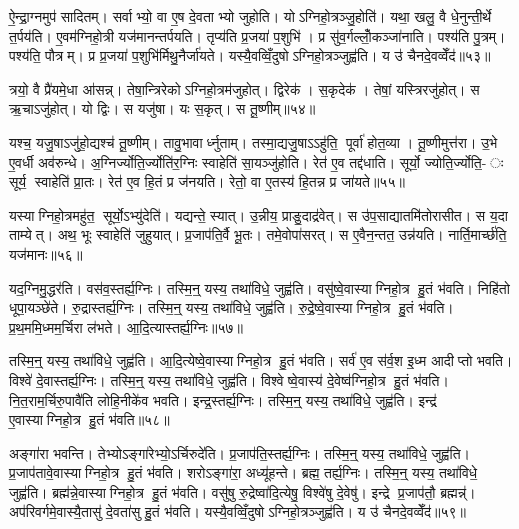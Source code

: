 ऐ॒न्द्रा॒ग्नमुप॑ सादितम्। सर्वाभ्यो॒ वा ए॒ष दे॒वताभ्यो जुहोति। योऽग्निहो॒त्रञ्जु॒होति॑। यथा॒ खलु॒ वै धे॒नुन्ती॒र्थे त॒र्पय॑ति। ए॒वम॑ग्निहो॒त्री यज॑मानन्तर्पयति। तृप्य॑ति प्र॒जया॑ प॒शुभि॑। प्र सु॑व॒र्गल्लोँ॒कञ्जा॑नाति। पश्य॑ति पु॒त्रम्। पश्य॑ति॒ पौत्रम्। प्र प्र॒जया॑ प॒शुभि॑र्मिथु॒नैर्जा॑यते। यस्यै॒वव्विँ॒दुषोऽग्निहो॒त्रञ्जुह्व॑ति। य उ॑ चैनदे॒वव्वेँद॑॥५३॥\anuvakamend[बुभू॑षेद्ध्रि॒यमा॑णञ्जायते॒ द्वे च॑]

त्रयो॒ वै प्रै॑यमे॒धा आ॑सन्न्। तेषा॒न्त्रिरेकोऽग्निहो॒त्रम॑जुहोत्। द्विरेक॑। स॒कृदेक॑। तेषां॒ यस्त्रिरजु॑होत्। स ऋ॒चाऽजु॑होत्। यो द्विः। स यजु॑षा। यः स॒कृत्। स तू॒ष्णीम्॥५४॥

यश्च॒ यजु॒षाऽजु॑हो॒द्यश्च॑ तू॒ष्णीम्। तावु॒भावार्ध्नुताम्। तस्मा॒द्यजु॒षाऽऽहु॑ति॒ पूर्वा॑ होत॒व्या। तू॒ष्णीमुत्त॑रा। उ॒भे ए॒वर्धी अव॑रुन्धे। अ॒ग्निर्ज्योति॒र्ज्योति॑र॒ग्निः स्वाहेति॑ सा॒यञ्जु॑होति। रेत॑ ए॒व तद्द॑धाति। सूर्यो॒ ज्योति॒र्ज्योति॒- ः सूर्य॒ स्वाहेति॑ प्रा॒तः। रेत॑ ए॒व हि॒तं प्र ज॑नयति। रेतो॒ वा ए॒तस्य॑ हि॒तन्न प्र जा॑यते॥५५॥

यस्याग्निहो॒त्रमहु॑त॒ सूर्यो॒ऽभ्यु॑देति॑। यद्यन्ते॒ स्यात्। उ॒न्नीय॒ प्राङु॒दाद्र॑वेत्। स उ॑प॒साद्यातमि॑तोरासीत। स य॒दा ताम्येत्। अथ॒ भूः स्वाहेति॑ जुहुयात्। प्र॒जाप॑ति॒र्वै भू॒तः। तमे॒वोपा॑सरत्। स ए॒वैन॒न्तत॒ उन्न॑यति। नार्ति॒मार्च्छ॑ति॒ यज॑मानः॥५६॥\anuvakamend[तू॒ष्णीञ्जा॑यते॒ यज॑मानः]

यद॒ग्निमु॒द्धर॑ति। वस॑व॒स्तर्ह्य॒ग्निः। तस्मि॒न्॒ यस्य॒ तथा॑विधे॒ जुह्व॑ति। वसु॑ष्वे॒वास्याग्निहो॒त्र हु॒तं भ॑वति। निहि॑तो धूपा॒यञ्छे॑ते। रु॒द्रास्तर्ह्य॒ग्निः। तस्मि॒न्॒ यस्य॒ तथा॑विधे॒ जुह्व॑ति। रु॒द्रे॒ष्वे॒वास्याग्निहो॒त्र हु॒तं भ॑वति। प्र॒थ॒ममि॒ध्मम॒र्चिरा ल॑भते। आ॒दि॒त्यास्तर्ह्य॒ग्निः॥५७॥

तस्मि॒न्॒ यस्य॒ तथा॑विधे॒ जुह्व॑ति। आ॒दि॒त्येष्वे॒वास्याग्निहो॒त्र हु॒तं भ॑वति। सर्व॑ ए॒व स॑र्व॒श इ॒ध्म आदीप्तो भवति। विश्वे॑ दे॒वास्तर्ह्य॒ग्निः। तस्मि॒न्॒ यस्य॒ तथा॑विधे॒ जुह्व॑ति। विश्वेष्वे॒वास्य॑ दे॒वेष्व॑ग्निहो॒त्र हु॒तं भ॑वति। नि॒त॒राम॒र्चिरु॒पावै॑ति लोहि॒नीके॑व भवति। इन्द्र॒स्तर्ह्य॒ग्निः। तस्मि॒न्॒ यस्य॒ तथा॑विधे॒ जुह्व॑ति। इन्द्र॑ ए॒वास्याग्निहो॒त्र हु॒तं भ॑वति॥५८॥

अङ्गा॑रा भवन्ति। तेभ्योऽङ्गा॑रेभ्यो॒ऽर्चिरुदे॑ति। प्र॒जाप॑ति॒स्तर्ह्य॒ग्निः। तस्मि॒न्॒ यस्य॒ तथा॑विधे॒ जुह्व॑ति। प्र॒जाप॑तावे॒वास्याग्निहो॒त्र हु॒तं भ॑वति। शरोऽङ्गा॑रा॒ अध्यू॑हन्ते। ब्रह्म॒ तर्ह्य॒ग्निः। तस्मि॒न्॒ यस्य॒ तथा॑विधे॒ जुह्व॑ति। ब्रह्म॑न्ने॒वास्याग्निहो॒त्र हु॒तं भ॑वति। वसु॑षु रु॒द्रेष्वा॑दि॒त्येषु॒ विश्वे॑षु दे॒वेषु॑। इन्द्रे प्र॒जाप॑तौ॒ ब्रह्मन्न्॑। अप॑रिवर्गमे॒वास्यै॒तासु॑ दे॒वता॑सु हु॒तं भ॑वति। यस्यै॒वव्विँ॒दुषोऽग्निहो॒त्रञ्जुह्व॑ति। य उ॑ चैनदे॒वव्वेँद॑॥५९॥\anuvakamend[आ॒दि॒त्यास्तर्ह्य॒ग्निरिन्द्र॑ ए॒वास्याग्निहो॒त्र हु॒तं भ॑वति दे॒वेषु॑ च॒त्वारि॑ च (यद॒ग्निन्निहि॑तः प्रथ॒म सर्व॑ ए॒व नि॑त॒रामङ्गा॑रा॒श्शरोऽङ्गा॑रा॒ ब्रह्म॒ वसु॑ष्व॒ष्टौ ॥ )]


